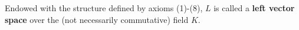 Endowed with the structure defined by axioms (1)-(8), $L$ is called a \textbf{left vector space} over the (not necessarily commutative) field $K$.

